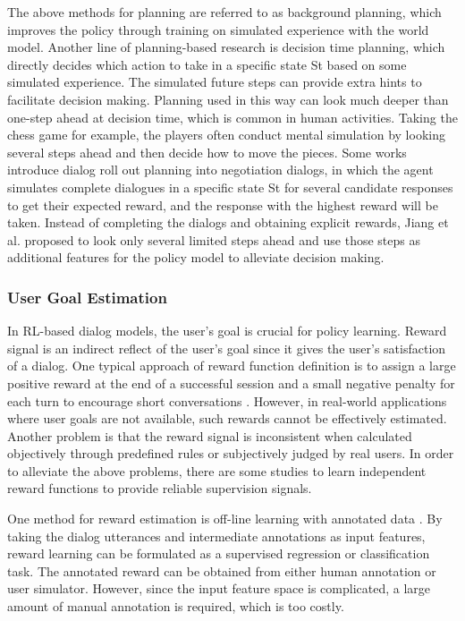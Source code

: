 \documentclass[10pt,twocolumn,letterpaper]{article}
\begin{document}
The above methods for planning are referred to as background planning, which improves the policy through training on simulated experience with the world model. Another line of planning-based research is decision time planning, which directly decides which action to take in a specific state St based on some simulated experience. The simulated future steps can provide extra hints to facilitate decision making. Planning used in this way can look much deeper than one-step ahead at decision time, which is common in human activities. Taking the chess game for example, the players often conduct mental simulation by looking several steps ahead and then decide how to move the pieces. Some works \cite{lewis2017deal,yarats2018hierarchical} introduce dialog roll out planning into negotiation dialogs, in which the agent simulates complete dialogues in a specific state St for several candidate responses to get their expected reward, and the response with the highest reward will be taken. Instead of completing the dialogs and obtaining explicit rewards, Jiang et al. \cite{jiang2019towards} proposed to look only several limited steps ahead and use those steps as additional features for the policy model to alleviate decision making.

\subsubsection{User Goal Estimation}
In RL-based dialog models, the user's goal is crucial for policy learning. Reward signal is an indirect reflect of the user's goal since it gives the user's satisfaction of a dialog. One typical approach of reward function definition is to assign a large positive reward at the end of a successful session and a small negative penalty for each turn to encourage short conversations \cite{su2018reward}. However, in real-world applications where user goals are not available, such rewards cannot be effectively estimated. Another problem is that the reward signal is inconsistent when calculated objectively through predefined rules or subjectively judged by real users. In order to alleviate the above problems, there are some studies to learn independent reward functions to provide reliable supervision signals.

One method for reward estimation is off-line learning with annotated data \cite{yang2012predicting}. By taking the dialog utterances and intermediate annotations as input features, reward learning can be formulated as a supervised regression or classification task. The annotated reward can be obtained from either human annotation or user simulator. However, since the input feature space is complicated, a large amount of manual annotation is required, which is too costly.
\end{document}
